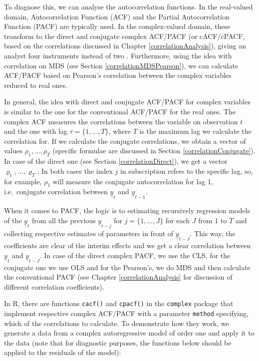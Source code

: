 \documentclass[
]{book}
\begin{document}
To diagnose this, we can analyse the autocorrelation functions. In the real-valued domain, Autocorrelation Function (ACF) and the Partial Autocorrelation Function (PACF) are typically used. In the complex-valued domain, these transform to the direct and conjugate complex ACF/PACF (or cACF/cPACF, based on the correlations discussed in Chapter \ref{correlationAnalysis}), giving an analyst four instruments instead of two \citep{ACFPACFReferences}. Furthermore, using the idea with correlation on MDS (see Section \ref{correlationMDSPearson}), we can calculate ACF/PACF based on Pearson's correlation between the complex variables reduced to real ones.

In general, the idea with direct and conjugate ACF/PACF for complex variables is similar to the one for the conventional ACF/PACF for the real ones. The complex ACF measures the correlations between the variable on observation \(t\) and the one with lag \(\tau=\{1, \dots, T\}\), where \(T\) is the maximum lag we calculate the correlation for. If we calculate the conjugate correlations, we obtain a vector of values \(\rho_{1}, \dots, \rho_{T}\) (specific formulae are discussed in Section \ref{correlationConjugate}). In case of the direct one (see Section \ref{correlationDirect}), we get a vector \(\varrho_{1}, \dots, \varrho_{T}\). In both cases the index \(j\) in subscription refers to the specific lag, so, for example, \(\rho_{1}\) will measure the conjugate autocorrelation for lag 1, i.e.~conjugate correlation between \(\underline{y}_{t}\) and \(\underline{y}_{t-1}\).

When it comes to PACF, the logic is to estimating recursively regression models of the \(\underline{y}_{t}\) from all the previous \(\underline{y}_{t-j}\) for \(j=\{1, \dots, J\}\) for each \(J\) from 1 to \(T\) and collecting respective estimates of parameters in front of \(\underline{y}_{t-J}\). This way, the coefficients are clear of the interim effects and we get a clear correlation between \(\underline{y}_{t}\) and \(\underline{y}_{t-J}\). In case of the direct complex PACF, we use the CLS, for the conjugate one we use OLS and for the Pearson's, we do MDS and then calculate the conventional PACF (see Chapter \ref{correlationAnalysis} for discussion of different correlation coefficients).

In R, there are functions \texttt{cacf()} and \texttt{cpacf()} in the \texttt{complex} package that implement respective complex ACF/PACF with a parameter \texttt{method} specifying, which of the correlations to calculate. To demonstrate how they work, we generate a data from a complex autoregressive model of order one and apply it to the data (note that for diagnostic purposes, the functions below should be applied to the residuals of the model):
\end{document}
